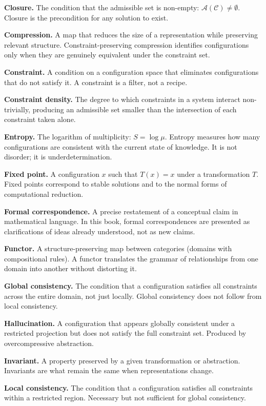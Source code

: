 \documentclass[11pt]{book}
\theoremstyle{plain}
\theoremstyle{definition}
\theoremstyle{remark}
\begin{document}
\textbf{Closure.} The condition that the admissible set is non-empty:
$\mathcal{A}(\mathcal{C}) \neq \emptyset$. Closure is the precondition for any
solution to exist.

\textbf{Compression.} A map that reduces the size of a representation
while preserving relevant structure. Constraint-preserving compression
identifies configurations only when they are genuinely equivalent under
the constraint set.

\textbf{Constraint.} A condition on a configuration space that
eliminates configurations that do not satisfy it. A constraint is a
filter, not a recipe.

\textbf{Constraint density.} The degree to which constraints in a
system interact non-trivially, producing an admissible set smaller than
the intersection of each constraint taken alone.

\textbf{Entropy.} The logarithm of multiplicity: $S = \log \mu$.
Entropy measures how many configurations are consistent with the
current state of knowledge. It is not disorder; it is underdetermination.

\textbf{Fixed point.} A configuration $x$ such that $T(x) = x$ under
a transformation $T$. Fixed points correspond to stable solutions and
to the normal forms of computational reduction.

\textbf{Formal correspondence.} A precise restatement of a conceptual
claim in mathematical language. In this book, formal correspondences
are presented as clarifications of ideas already understood, not as
new claims.

\textbf{Functor.} A structure-preserving map between categories
(domains with compositional rules). A functor translates the grammar
of relationships from one domain into another without distorting it.

\textbf{Global consistency.} The condition that a configuration
satisfies all constraints across the entire domain, not just locally.
Global consistency does not follow from local consistency.

\textbf{Hallucination.} A configuration that appears globally
consistent under a restricted projection but does not satisfy the full
constraint set. Produced by overcompressive abstraction.

\textbf{Invariant.} A property preserved by a given transformation or
abstraction. Invariants are what remain the same when representations
change.

\textbf{Local consistency.} The condition that a configuration satisfies
all constraints within a restricted region. Necessary but not sufficient
for global consistency.
\end{document}
